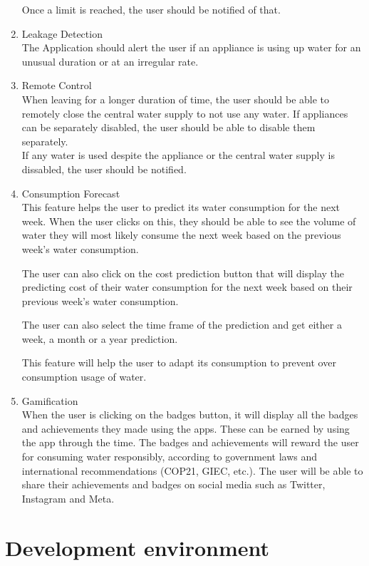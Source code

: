 \documentclass[10pt]{article}
\begin{document}
\begin{multicols}{2}
\begin{enumerate}
  Once a limit is reached, the user should be notified of that.


  \item {Leakage Detection} \\
  The Application should alert the user if an appliance is using up water for an unusual duration or at an irregular rate.
  
  \item {Remote Control} \\
  When leaving for a longer duration of time, the user should be able to remotely close the central water supply to not use any water. If appliances can be separately disabled, the user should be able to disable them separately. \\
  If any water is used despite the appliance or the central water supply is dissabled, the user should be notified.

  \item {Consumption Forecast} \\
  This feature helps the user to predict its water consumption for the next week. When the user clicks on this, they should be able to see the volume of water they will most likely consume the next week based on the previous week's water consumption.

  The user can also click on the cost prediction button that will display the predicting cost of their water consumption for the next week based on their previous week's water consumption.

  The user can also select the time frame of the prediction and get either a week, a month or a year prediction.

  This feature will help the user to adapt its consumption to prevent over consumption usage of water.

  \item {Gamification} \\
  When the user is clicking on the badges button, it will display all the badges and achievements they made using the apps. These can be earned by using the app through the time. The badges and achievements will reward the user for consuming water responsibly, according to government laws and international recommendations (COP21, GIEC, etc.). The user will be able to share their achievements and badges on social media such as Twitter, Instagram and Meta.

\end{enumerate}


\section{Development environment}


\end{multicols}
\end{document}
